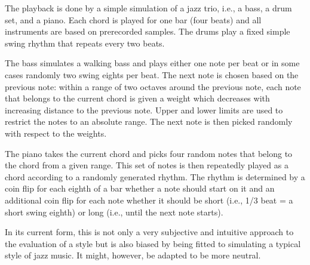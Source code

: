 The playback is done by a simple simulation of a jazz trio, i.e., a bass, a drum set, and a piano.
Each chord is played for one bar (four beats) and all instruments are based on prerecorded samples. The drums play a fixed simple swing rhythm that repeats every two beats.

The bass simulates a walking bass and plays either one note per beat or in some cases randomly two swing eights per beat.
The next note is chosen based on the previous note: within a range of two octaves around the previous note, each note that belongs to the current chord is given a weight which decreases with increasing distance to the previous note.
Upper and lower limits are used to restrict the notes to an absolute range.
The next note is then picked randomly with respect to the weights.

The piano takes the current chord and picks four random notes that belong to the chord from a given range.
This set of notes is then repeatedly played as a chord according to a randomly generated rhythm.
The rhythm is determined by a coin flip for each eighth of a bar whether a note should start on it and an additional coin flip for each note whether it should be short (i.e., 1/3 beat = a short swing eighth) or long (i.e., until the next note starts).

In its current form, this is not only a very subjective and intuitive approach to the evaluation of a style but is also biased by being fitted to simulating a typical style of jazz music.
It might, however, be adapted to be more neutral.
